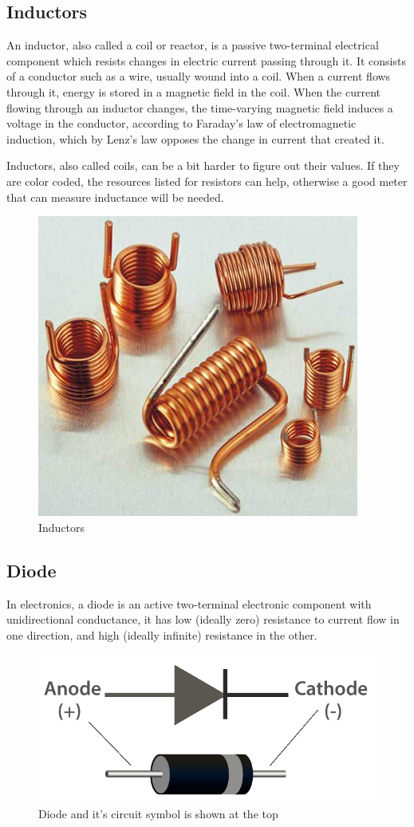 \subsection*{Inductors}

An inductor, also called a coil or reactor, is a passive two-terminal electrical component which resists changes in electric current passing through it. It consists of a conductor such as a wire, usually wound into a coil. When a current flows through it, energy is stored in a magnetic field in the coil. When the current flowing through an inductor changes, the time-varying magnetic field induces a voltage in the conductor, according to Faraday’s law of electromagnetic induction, which by Lenz's law opposes the change in current that created it. 

\vspace{0.25cm}

\noindent Inductors, also called coils, can be a bit harder to figure out their values. If they are color coded, the resources listed for resistors can help, otherwise a good meter that can measure inductance will be needed.

\begin{figure}[H]
    \centering
    \includegraphics[width=0.4\linewidth]{img/inductor.jpg}
    \caption{Inductors}
    \label{fig:inductors}
\end{figure}

\subsection*{Diode}

In electronics, a diode is an active two-terminal electronic component with unidirectional conductance, it has low (ideally zero) resistance to current flow in one direction, and high (ideally infinite) resistance in the other.

\begin{figure}[H]
    \centering
    \includegraphics[width=0.5\linewidth]{img/diode.png}
    \caption{Diode and it's circuit symbol is shown at the top}
    \label{fig:diode}
\end{figure}

